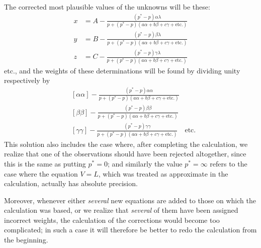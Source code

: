 %
The corrected most plausible values of the unknowns will be these:
\[
\begin{aligned}
x&=A-\frac{(p^*-p)\alpha\lambda}{p+(p^*-p)(a\alpha+b\beta+c\gamma+\text{etc.})}\\[7pt]
y&=B-\frac{(p^*-p)\beta\lambda}{p+(p^*-p)(a\alpha+b\beta+c\gamma+\text{etc.})}\\[7pt]
z&=C-\frac{(p^*-p)\gamma\lambda}{p+(p^*-p)(a\alpha+b\beta+c\gamma+\text{etc.})}
\end{aligned}
\]
etc., and the weights of these determinations will be found by dividing unity respectively by
\[
\begin{aligned}
&[\alpha\alpha]-\frac{(p^*-p)\alpha\alpha}{p+(p^*-p)(a\alpha+b\beta+c\gamma+\text{etc.})}\\[7pt]
&[\beta\beta]-\frac{(p^*-p)\beta\beta}{p+(p^*-p)(a\alpha+b\beta+c\gamma+\text{etc.})}\\[7pt]
&[\gamma\gamma]-\frac{(p^*-p)\gamma\gamma}{p+(p^*-p)(a\alpha+b\beta+c\gamma+\text{etc.})}\quad\text{etc.}
\end{aligned}
\]
This solution also includes the case where, after completing the calculation, we realize that one of the observations should have been rejected altogether, since this is the same as putting \(p^*=0\); and similarly the value \(p^*=\infty\) refers to the case where the equation \(V=L\), which was treated as approximate in the calculation, actually has absolute precision.

Moreover, whenever either \textit{several} new equations are added to those on which the calculation was based, or we realize that \textit{several} of them have been assigned incorrect weights, the calculation of the corrections would become too complicated; in such a case it will therefore be better to redo the calculation from the beginning.

\clearpage
